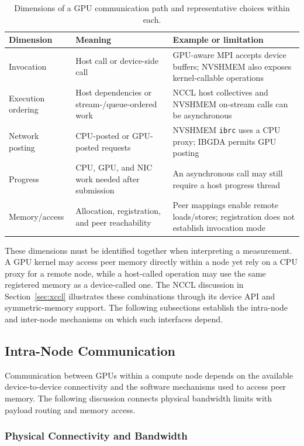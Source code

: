 \begin{table}[htbp]
\centering
\caption[Dimensions of a GPU communication path]{Dimensions of a GPU communication path and representative choices within each.}
\label{tab:m-initiation-axes}
\scriptsize
\begin{tabularx}{\textwidth}{lYY}
\toprule
Dimension & Meaning & Example or limitation\\
\midrule
Invocation & Host call or device-side call & GPU-aware MPI accepts device buffers; NVSHMEM also exposes kernel-callable operations\\
Execution ordering & Host dependencies or stream-/queue-ordered work & NCCL host collectives and NVSHMEM on-stream calls can be asynchronous\\
Network posting & CPU-posted or GPU-posted requests & NVSHMEM \texttt{ibrc} uses a CPU proxy; IBGDA permits GPU posting\\
Progress & CPU, GPU, and NIC work needed after submission & An asynchronous call may still require a host progress thread\\
Memory/access & Allocation, registration, and peer reachability & Peer mappings enable remote loads/stores; registration does not establish invocation mode\\
\bottomrule
\end{tabularx}
\end{table}

These dimensions must be identified together when interpreting a measurement. A GPU kernel may access peer memory directly within a node yet rely on a CPU proxy for a remote node, while a host-called operation may use the same registered memory as a device-called one. The NCCL discussion in Section~\ref{sec:xccl} illustrates these combinations through its device API and symmetric-memory support. The following subsections establish the intra-node and inter-node mechanisms on which such interfaces depend.

\subsection{Intra-Node Communication}\label{sec:intra-node}

Communication between GPUs within a compute node depends on the available device-to-device connectivity and the software mechanisms used to access peer memory. The following discussion connects physical bandwidth limits with payload routing and memory access.

\subsubsection{Physical Connectivity and Bandwidth}

